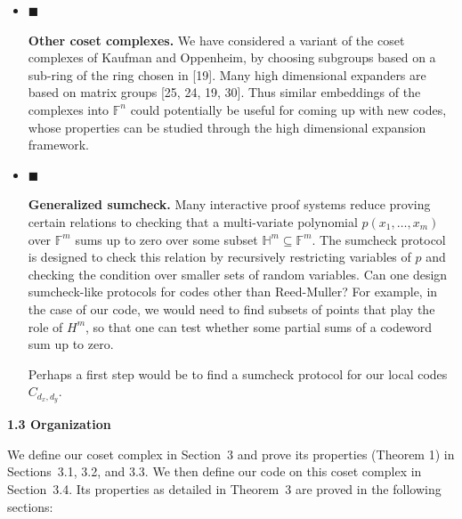 \begin{itemize}
\item[] 
$\blacksquare$ 


\textbf{Other coset complexes.} We have considered a variant of the coset complexes of Kaufman and Oppenheim, by choosing subgroups based on a sub-ring of the ring chosen in [19]. Many high dimensional expanders are based on matrix groups [25, 24, 19, 30]. Thus similar embeddings of the complexes into $\mathbb{F}^{n}$ could potentially be useful for coming up with new codes, whose properties can be studied through the high dimensional expansion framework.\par





\item[] 
$\blacksquare$ 


\textbf{Generalized sumcheck.} Many interactive proof systems reduce proving certain relations to checking that a multi-variate polynomial $p(x_{1},\dots,x_{m})$ over $\mathbb{F}^{m}$ sums up to zero over some subset $\mathbb{H}^{m}\subseteq\mathbb{F}^{m}$. The sumcheck protocol is designed to check this relation by recursively restricting variables of $p$ and checking the condition over smaller sets of random variables.
Can one design sumcheck-like protocols for codes other than Reed-Muller? For example, in the case of our code, we would need to find subsets of points that play the role of $H^{m}$, so that one can test whether some partial sums of a codeword sum up to zero.\par




Perhaps a first step would be to find a sumcheck protocol for our local codes $C_{d_{x},d_{y}}$.\par





\end{itemize}





\par\medskip\noindent\textbf{
1.3 Organization}\par




We define our coset complex in Section 3 and prove its properties (Theorem 1) in Sections 3.1, 3.2, and 3.3. We then define our code on this coset complex in Section 3.4. Its properties as detailed in Theorem 3 are proved in the following sections:\par


